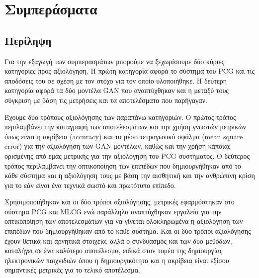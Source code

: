 \chapter{Συμπεράσματα}

\section{Περίληψη}
\par
Για την εξαγωγή των συμπερασμάτων μπορούμε να ξεχωρίσουμε δύο κύριες κατηγορίες προς αξιολόγηση. Η πρώτη κατηγορία αφορά το σύστημα του PCG και τις αποδόσεις του σε σχέση με τον στόχο για τον οποίο υλοποιήθηκε. Η δεύτερη κατηγορία αφορά τα δύο μοντέλα GAN που αναπτύχθηκαν και η μεταξύ τους σύγκριση με βάση τις μετρήσεις και τα αποτελέσματα που παρήγαγαν.
\par
Έχουμε δύο τρόπους αξιολόγησης των παραπάνω κατηγοριών. Ο πρώτος τρόπος περιλαμβάνει την καταγραφή των αποτελεσμάτων και την χρήση γνωστών μετρικών όπως είναι η ακρίβεια (accuracy) και το μέσο τετραγωνικό σφάλμα (mean square error) για την αξιολόγηση των GAN μοντέλων, καθώς και την χρήση κάποιας ορισμένης από εμάς μετρικής για την αξιολόγηση του PCG συστήματος. Ο δεύτερος τρόπος περιλαμβάνει την οπτικοποίηση των επιπέδων που δημιουργήθηκαν από το κάθε σύστημα και η αξιολόγηση τους με βάση την αισθητική και την ανθρώπινη κρίση για το εάν είναι ένα τεχνικά σωστό και πρωτότυπο επίπεδο.
\par
Χρησιμοποιήθηκαν και οι δύο τρόποι αξιολόγησης, μετρικές εφαρμόστηκαν στο σύστημα PCG και MLCG ενώ παράλληλα αναπτύχθηκαν εργαλεία για την οπτικοποίηση των αποτελεσμάτων για να γίνεται ολοκληρωμένα η αξιολόγηση των επιπέδων που δημιουργήθηκαν από το κάθε σύστημα. Και οι δύο τρόποι αξιολόγησης έχουν θετικά και αρνητικά στοιχεία, αλλά ο συνδυασμός και των δύο μεθόδων, καταλήγει σε ένα καλύτερο αποτέλεσμα, ειδικά στον τομέα της δημιουργίας ηλεκτρονικών παιχνιδιών όπου η δημιουργικότητα και η ακρίβεια είναι εξίσου σημαντικές μετρικές για το τελικό αποτέλεσμα.

